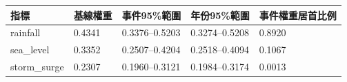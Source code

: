 \begin{tabular}{lllll}
\hline
指標 & 基線權重 & 事件95\%範圍 & 年份95\%範圍 & 事件權重居首比例 \\
\hline
rainfall & 0.4341 & 0.3376–0.5203 & 0.3274–0.5208 & 0.8920 \\
sea\_level & 0.3352 & 0.2507–0.4204 & 0.2518–0.4094 & 0.1067 \\
storm\_surge & 0.2307 & 0.1960–0.3121 & 0.1984–0.3174 & 0.0013 \\
\hline
\end{tabular}